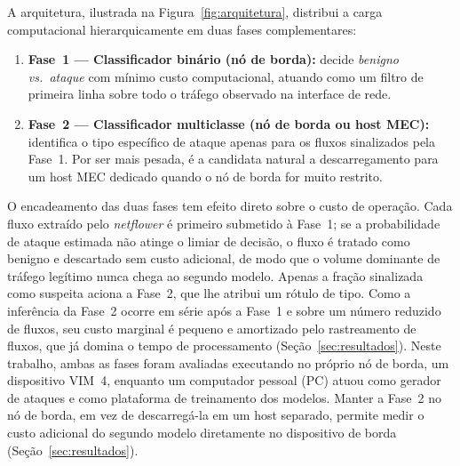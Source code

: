 \documentclass[12pt]{article}
\begin{document}
A arquitetura, ilustrada na Figura~\ref{fig:arquitetura}, distribui a carga
computacional hierarquicamente em duas fases complementares:

\begin{enumerate}
  \item \textbf{Fase~1 — Classificador binário (nó de borda):} decide
    \textit{benigno vs.\ ataque} com mínimo custo computacional, atuando como um
    filtro de primeira linha sobre todo o tráfego observado na interface de rede.
  \item \textbf{Fase~2 — Classificador multiclasse (nó de borda ou host MEC):}
    identifica o tipo específico de ataque apenas para os fluxos sinalizados pela
    Fase~1. Por ser mais pesada, é a candidata natural a descarregamento para um
    host MEC dedicado quando o nó de borda for muito restrito.
\end{enumerate}

O encadeamento das duas fases tem efeito direto sobre o custo de operação. Cada
fluxo extraído pelo \textit{netflower} é primeiro submetido à Fase~1; se a
probabilidade de ataque estimada não atinge o limiar de decisão, o fluxo é
tratado como benigno e descartado sem custo adicional, de modo que o volume
dominante de tráfego legítimo nunca chega ao segundo modelo. Apenas a fração
sinalizada como suspeita aciona a Fase~2, que lhe atribui um rótulo de tipo. Como
a inferência da Fase~2 ocorre em série após a Fase~1 e sobre um número reduzido
de fluxos, seu custo marginal é pequeno e amortizado pelo rastreamento de fluxos,
que já domina o tempo de processamento (Seção~\ref{sec:resultados}). Neste
trabalho, ambas as fases foram avaliadas executando no próprio nó de
borda, um dispositivo VIM~4, enquanto um computador pessoal (PC) atuou como
gerador de ataques e como plataforma de treinamento dos modelos. Manter a Fase~2
no nó de borda, em vez de descarregá-la em um host separado, permite medir o
custo adicional do segundo modelo diretamente no dispositivo de borda
(Seção~\ref{sec:resultados}).
\end{document}
